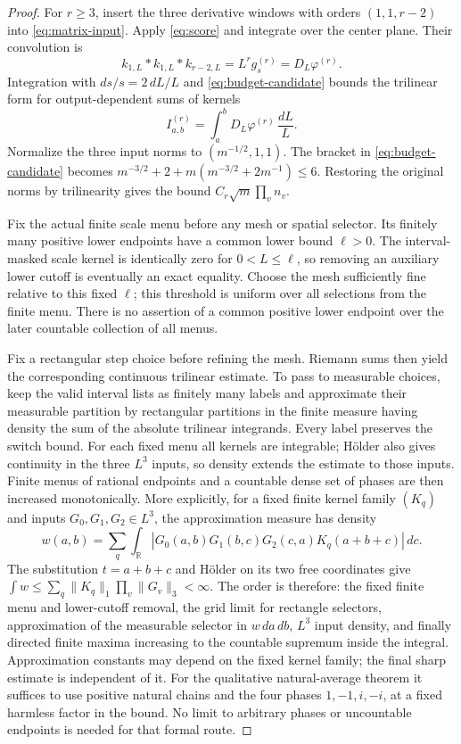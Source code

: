 \documentclass[11pt,a4paper]{article}
\theoremstyle{definition}
\newcommand{\R}{\mathbb R}
\newcommand{\1}{\mathbf1}
\begin{document}
\begin{proof}
For $r\ge3$, insert the three derivative windows with orders
$(1,1,r-2)$ into \eqref{eq:matrix-input}. Apply \eqref{eq:score} and
integrate over the center plane. Their convolution is
\[
 k_{1,L}*k_{1,L}*k_{r-2,L}=L^r g_s^{(r)}=D_L\varphi^{(r)}.
\]
Integration with $ds/s=2\,dL/L$ and \eqref{eq:budget-candidate}
bounds the trilinear form for output-dependent sums of kernels
\[
 I_{a,b}^{(r)}=\int_a^b D_L\varphi^{(r)}\,\frac{dL}{L}.
\]
Normalize the three input norms to $(m^{-1/2},1,1)$. The bracket in
\eqref{eq:budget-candidate} becomes
$m^{-3/2}+2+m(m^{-3/2}+2m^{-1})\le6$.
Restoring the original norms by trilinearity gives the bound
$C_r\sqrt m\prod_v n_v$.

Fix the actual finite scale menu before any mesh or spatial selector.
Its finitely many positive lower endpoints have a common lower bound
$\ell>0$. The interval-masked scale kernel is identically zero for
$0<L\le\ell$, so removing an auxiliary lower cutoff is eventually an
exact equality. Choose the mesh sufficiently fine relative to this fixed
$\ell$; this threshold is uniform over all selections from the finite menu.
There is no assertion of a common positive lower endpoint over the later
countable collection of all menus.

Fix a rectangular step choice before refining the mesh. Riemann sums then yield the corresponding continuous
trilinear estimate. To pass to measurable choices, keep the valid
interval lists as finitely many labels and approximate their measurable
partition by rectangular partitions in the finite measure having density
the sum of the absolute trilinear integrands. Every label preserves the
switch bound. For each fixed menu all kernels are integrable; H\"older
also gives continuity in the three $L^3$ inputs, so density extends the
estimate to those inputs. Finite menus of rational endpoints and a
countable dense set of phases are then increased monotonically.
More explicitly, for a fixed finite kernel family $(K_q)$ and inputs
$G_0,G_1,G_2\in L^3$, the approximation measure has density
\[
 w(a,b)=\sum_q\int_{\R}
 |G_0(a,b)G_1(b,c)G_2(c,a)K_q(a+b+c)|\,dc.
\]
The substitution $t=a+b+c$ and H\"older on its two free coordinates give
$\int w\le\sum_q\|K_q\|_1\prod_v\|G_v\|_3<\infty$.
The order is therefore: the fixed finite menu and lower-cutoff removal,
the grid limit for rectangle selectors, approximation of the measurable
selector in $w\,da\,db$, $L^3$ input density, and finally directed finite
maxima increasing to the countable supremum inside the integral.
Approximation constants may depend on the fixed kernel family; the final
sharp estimate is independent of it. For the qualitative natural-average
theorem it suffices to use positive natural chains and the four phases
$1,-1,i,-i$, at a fixed harmless factor in the bound. No limit to arbitrary
phases or uncountable endpoints is needed for that formal route.


\end{proof}
\end{document}
